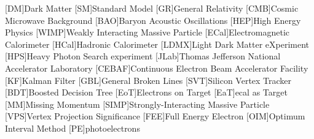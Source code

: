 
\usepackage{silence} %

\usepackage{epsfig} %
\usepackage{epic} %
\usepackage{eepic} %
\usepackage{url} %
\usepackage{longtable} %
\usepackage{mathrsfs} %
\usepackage{multirow} %
\usepackage{bigstrut} %
\usepackage{amssymb} %
\usepackage{graphicx} %
\usepackage{setspace} %
\usepackage{xspace} %
\usepackage{amsmath} %
\usepackage{siunitx} %
\usepackage{booktabs} %
\usepackage{hyperref} %
\usepackage{subcaption}
\usepackage{graphicx} %

\usepackage[noabbrev,capitalise]{cleveref} %

\newcommand{\creflastconjunction}{, and } %

\usepackage[compat=1.1.0]{tikz-feynman} %

\usepackage{hepunits}

\newcommand{\fourgev}{\qty{4}{GeV}\xspace}
\newcommand{\eightgev}{\qty{8}{GeV}\xspace}
\newcommand{\ecal}{ECal\xspace}
\newcommand{\hcal}{HCal\xspace}

\usepackage{acronym}
[DM]{Dark Matter}
[SM]{Standard Model}
[GR]{General Relativity}
[CMB]{Cosmic Microwave Background}
[BAO]{Baryon Acoustic Oscillations}
[HEP]{High Energy Physics}
[WIMP]{Weakly Interacting Massive Particle}
[ECal]{Electromagnetic Calorimeter}
[HCal]{Hadronic Calorimeter}
[LDMX]{Light Dark Matter eXperiment}
[HPS]{Heavy Photon Search experiment}
[JLab]{Thomas Jefferson National Accelerator Laboratory}
[CEBAF]{Continuous Electron Beam Accelerator Facility}
[KF]{Kalman Filter}
[GBL]{General Broken Lines}
[SVT]{Silicon Vertex Tracker}
[BDT]{Boosted Decision Tree}
[EoT]{Electrons on Target}
[EaT]{\ac{ecal} as Target}
[MM]{Missing Momentum}
[SIMP]{Strongly-Interacting Massive Particle}
[VPS]{Vertex Projection Significance}
[FEE]{Full Energy Electron}
[OIM]{Optimum Interval Method}
[PE]{photoelectrons}

